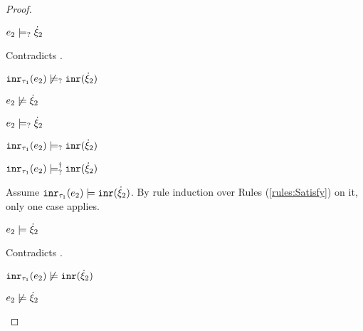 \begin{proof}
\begin{byCases}
\begin{byCases}
\begin{byCases}
\begin{byCases}
                \begin{pfsteps*}
                \item $e_2 \models_{?} \dot{\xi}_2$
                \end{pfsteps*}
                Contradicts .
            \end{byCases}
            \begin{pfsteps*}
            \item $\mathtt{inr}_{\tau_1}({e_2}) \not\models_{?} \mathtt{inr}(\dot{\xi}_2)$ 
            \end{pfsteps*}
        \item[\cmaysatisfy{e_2}{\hxi_2}]
            \begin{pfsteps*}
            \item $e_2 \not\models \dot{\xi}_2$  
            \item $e_2 \models_{?} \dot{\xi}_2$  
            \item $\mathtt{inr}_{\tau_1}({e_2}) \models_{?} \mathtt{inr}(\dot{\xi}_2)$  
            \item $\mathtt{inr}_{\tau_1}({e_2}) \models_{?}^{\dag} \mathtt{inr}(\dot{\xi}_2)$ 
            \end{pfsteps*}
            Assume $\mathtt{inr}_{\tau_1}({e_2}) \models \mathtt{inr}(\dot{\xi}_2)$. By rule induction over Rules (\ref{rules:Satisfy}) on it, only one case applies.
            \begin{byCases}
            \item[\text{(\ref{rule:CSInr})}]
                \begin{pfsteps*}
                \item $e_2 \models \dot{\xi}_2$
                \end{pfsteps*}
                Contradicts .
            \end{byCases}
            \begin{pfsteps*}
            \item $\mathtt{inr}_{\tau_1}({e_2}) \not\models \mathtt{inr}(\dot{\xi}_2)$ 
            \end{pfsteps*}
        \item[\cnotsatisfyormay{e_2}{\hxi_2}]
            \begin{pfsteps*}
            \item $e_2 \not\models \dot{\xi}_2$  

\end{pfsteps*}
\end{byCases}
\end{byCases}
\end{byCases}
\end{proof}
